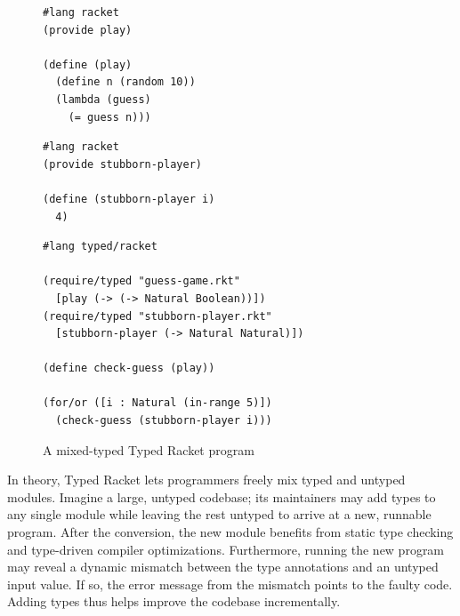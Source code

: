 \begin{figure}[h]
  \begin{minipage}[t]{0.45\columnwidth}
    \begin{lstlisting}
#lang racket
(provide play)

(define (play)
  (define n (random 10))
  (lambda (guess)
    (= guess n)))
    \end{lstlisting}

  \end{minipage}\begin{minipage}[t]{0.45\columnwidth}
    \begin{lstlisting}
#lang racket
(provide stubborn-player)

(define (stubborn-player i)
  4)
    \end{lstlisting}

  \end{minipage}

  \smallskip
  \begin{centering}
    \begin{minipage}{0.6\columnwidth}
      \begin{lstlisting}
#lang typed/racket

(require/typed "guess-game.rkt"
  [play (-> (-> Natural Boolean))])
(require/typed "stubborn-player.rkt"
  [stubborn-player (-> Natural Natural)])

(define check-guess (play))

(for/or ([i : Natural (in-range 5)])
  (check-guess (stubborn-player i)))
      \end{lstlisting}
    \end{minipage}
  \end{centering}

  \caption{A mixed-typed Typed Racket program~\cite{gtnffvf-jfp-2019}}
  \label{fig:guess-game}
\end{figure}

In theory, Typed Racket lets programmers freely mix typed and untyped modules.
Imagine a large, untyped codebase;
 its maintainers may add types to any single module while leaving the rest
 untyped to arrive at a new, runnable program.
After the conversion, the new module benefits from static type checking
 and type-driven compiler optimizations.
Furthermore, running the new program may reveal a dynamic mismatch between
 the type annotations and an untyped input value.
If so, the error message from the mismatch points to the faulty code.
Adding types thus helps improve the codebase incrementally.

